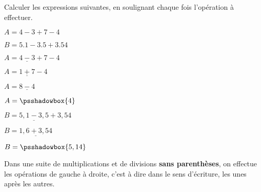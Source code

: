 \begin{exemple}[0.35]
   Calculer les expressions suivantes, en soulignant chaque fois l'opération à effectuer.
   
   $A=4-3+7-4$ 
   
   $B=\num{5.1}-\num{3.5}+\num{3.54}$
   \correction
   
   \smallskip
   \begin{minipage}{0.52\linewidth}
      \begin{list}{}{}
               \item $A=\underline{4-3}+7-4$
               \item $A=\underline{1+7}-4$
               \item $A=\underline{8-4}$
               \item $A=\psshadowbox{4}$             
      \end{list}
   \end{minipage}      
   \begin{minipage}{0.47\linewidth}
      \begin{list}{}{}
         \item $B=\underline{5,1-3,5}+3,54$
         \item $B=\underline{1,6+3,54}$
         \item $B=\psshadowbox{5,14}$
      \end{list}
   \end{minipage}   
\end{exemple}

\begin{propriete}[\admise]   
   Dans une suite de multiplications et de divisions \textbf{sans parenthèses}, on effectue les opérations de gauche à droite, c'est à dire dans le sens d'écriture, les unes après les autres.
\end{propriete}

